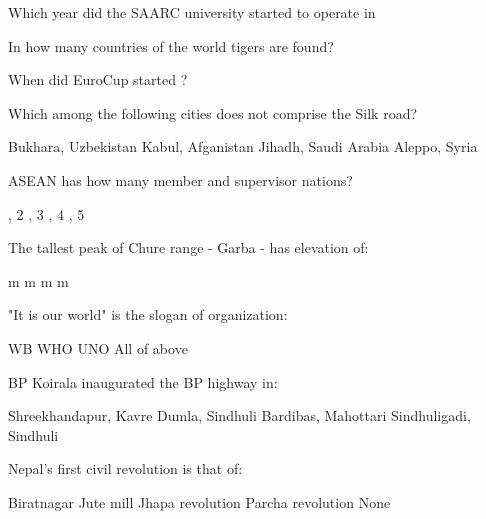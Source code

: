 \begin{questions}
\question Which year did the SAARC university started to operate in
  \begin{choices}
  \end{choices}

\question In how many countries of the world tigers are found?
  \begin{choices}
  \end{choices}

\question When did EuroCup started ?
  \begin{choices}
  \end{choices}

\question Which among the following cities does not comprise the Silk road?
  \begin{choices}
  \choice Bukhara, Uzbekistan
  \choice Kabul, Afganistan
  \CorrectChoice Jihadh, Saudi Arabia
  \choice Aleppo, Syria
  \end{choices}
  
\question ASEAN has how many member and supervisor nations?
  \begin{choices}
  , 2
  , 3
  , 4
  , 5
  \end{choices}

\question The tallest peak of Chure range - Garba - has elevation of:
  \begin{choices}
   m
   m
   m
   m
  \end{choices}
  
\question "It is our world" is the slogan of \fillin[][3cm] organization:
  \begin{choices}
  \choice WB
  \choice WHO
  \CorrectChoice UNO
  \choice All of above
  \end{choices}
  
\question BP Koirala inaugurated the BP highway in:
  \begin{choices}
  \CorrectChoice Shreekhandapur, Kavre
  \choice Dumla, Sindhuli
  \choice Bardibas, Mahottari
  \choice Sindhuligadi, Sindhuli
  \end{choices}

\question Nepal's first civil revolution is that of:
  \begin{choices}
  \CorrectChoice Biratnagar Jute mill
  \choice Jhapa revolution
  \choice Parcha revolution
  \choice None
  \end{choices}


\end{questions}
